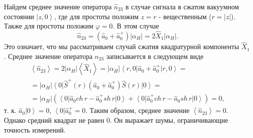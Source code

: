 Найдем среднее значение оператора $\hat{n}_{23}$ в случае сигнала в
сжатом вакуумном состоянии $\left|z, 0\right>$, где для простоты
положим $z = r$ - вещественным ($r = \left|z\right|$). Также для
простоты положим $\varphi = 0$. В этом случае 
\[
\hat{n}_{23} =
\left(\hat{a}_0 + \hat{a}_0^{+}\right) \left|\alpha_H\right| = 
2 \hat{X}_1 \left|\alpha_H\right|.
\]
Это означает, что мы рассматриваем случай сжатия квадратурной
компоненты $\hat{X}_1$. Среднее значение оператора $\hat{n}_{23}$
записывается в следующем виде
\begin{eqnarray}
\left<\hat{n}_{23}\right> = 
2 \left|\alpha_H\right|\left<\hat{X}_1\right> = 
\left|\alpha_H\right|\left<r, 0\right|\hat{a}_0 +
\hat{a}_0^{+}\left|r, 0\right> =
\nonumber \\
=
\left|\alpha_H\right|\left<0\right|
\hat{S}^{+}\left(r\right)
\left(\hat{a}_0 +
\hat{a}_0^{+}\right)
\hat{S}\left(r\right)
\left|0\right> =
\nonumber \\
=
\left|\alpha_H\right|
\left(
\left<0\right|
\hat{a}_0 ch\,r -
\hat{a}_0^{+} sh\,r
\left|0\right> 
+
\left<0\right|
\hat{a}_0^{+} ch\,r -
\hat{a}_0 sh\,r
\left|0\right> 
\right)
= 0,
\nonumber
\end{eqnarray}
т. к. $\hat{a}_0\left|0\right> = 0$, 
$\left<0\right|\hat{a}_0^{+} = 0$.
Таким образом, среднее значение $\left<\hat{n}_{23}\right> =
0$. Однако средний квадрат не равен 0. Он выражает шумы, ограничивающие
точность измерений.

